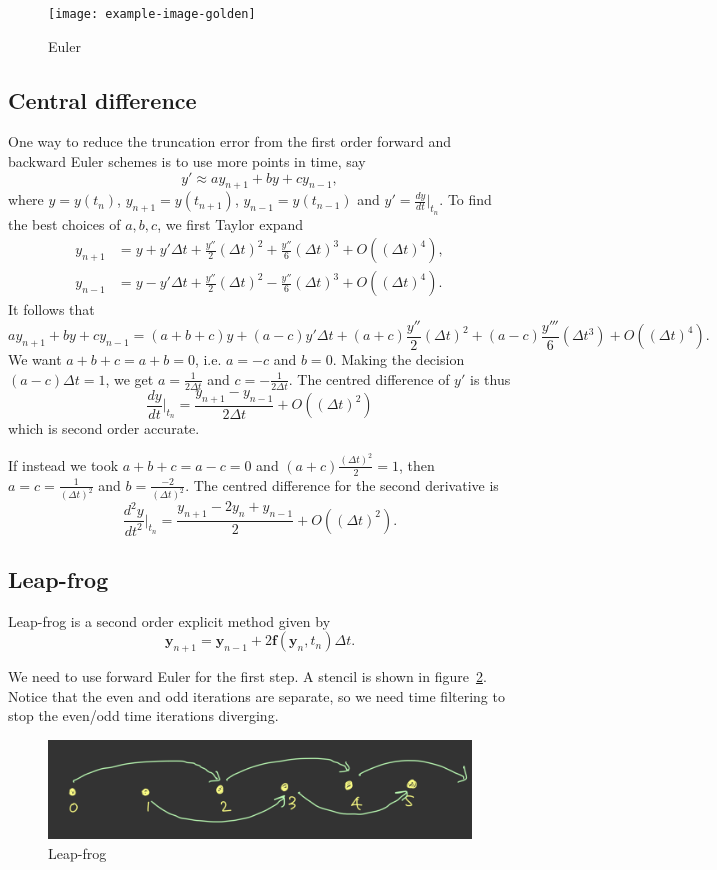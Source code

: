 \documentclass[11pt, a4paper]{article}
\theoremstyle{break}
\newcommand{\ve}{\mathbf} %
\newcommand{\dt}{\Delta t}
\newcommand{\dder}[2]{\frac{d #1}{d #2}}
\newcommand{\ddder}[3][2]{\frac{d^#1 #2}{d #3^#1}}
\newcommand{\eval}[1]{\big\rvert_{#1}}
\newcommand{\Eval}[1]{\bigg\rvert_{#1}}
\begin{document}
\begin{figure}\centering
	\texttt{[image: example-image-golden]}
	\caption{Euler}\label{fig:euler}
\end{figure}

\subsection{Central difference}
One way to reduce the truncation error from the first order forward and backward Euler schemes is to use more points in time, say \[y'\approx a	y_{n+1}+by+cy_{n-1},\] where $y=y(t_n)$, $y_{n+1}=y(t_{n+1})$, $y_{n-1}=y(t_{n-1})$ and $y' = \dder yt\eval{t_n}$. To find the best choices of $a,b,c$, we first Taylor expand \begin{align*}
y_{n+1}&=y+y'\dt+\frac{y''}{2}(\dt)^2+\frac{y''}{6}(\dt)^3+O((\dt)^4),\\
y_{n-1}&=y-y'\dt+\frac{y''}{2}(\dt)^2-\frac{y''}{6}(\dt)^3+O((\dt)^4).
\end{align*} It follows that \[ay_{n+1}+by+cy_{n-1}=(a+b+c)y+(a-c)y'\dt+(a+c)\frac{y''}{2}(\dt)^2 +(a-c)\frac{y'''}{6}(\dt^3)+O((\dt)^4).\]
We want $a+b+c=a+b=0$, i.e. $a=-c$ and $b=0$. Making the decision $(a-c)\dt=1$, we get $a=\frac1{2\dt}$ and $c=-\frac1{2\dt}$. The centred difference of $y'$ is thus \[\dder yt\Eval{t_n}=\frac{y_{n+1}-y_{n-1}}{2\dt}+O((\dt)^2)\] which is second order accurate.

If instead we took $a+b+c=a-c=0$ and $(a+c)\frac{(\dt)^2}{2}=1$, then $a=c=\frac1{(\dt)^2}$ and $b=\frac{-2}{(\dt)^2}$. The centred difference for the second derivative is \[\ddder yt\Eval{t_n}=\frac{y_{n+1}-2y_n+y_{n-1}}{2}+O((\dt)^2).\]

\subsection{Leap-frog}
Leap-frog is a second order explicit method given by
\[\ve y_{n+1}=\ve y_{n-1}+2\ve f(\ve y_n,t_n)\dt.\]

We need to use forward Euler for the first step. A stencil is shown in figure~\ref{fig:leapFrog}. Notice that the even and odd iterations are separate, so we need time filtering to stop the even/odd time iterations diverging.



\begin{figure}\centering
	\includegraphics[width=0.7\linewidth]{leapfrog}
	\caption{Leap-frog}\label{fig:leapFrog}
\end{figure}
\end{document}
